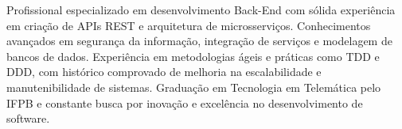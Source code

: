 \begin{cvletter}
  Profissional especializado em desenvolvimento Back-End com sólida experiência em criação de APIs REST e arquitetura de microsserviços. 
  Conhecimentos avançados em segurança da informação, integração de serviços e modelagem de bancos de dados. 
  Experiência em metodologias ágeis e práticas como TDD e DDD, com histórico comprovado de melhoria na escalabilidade e manutenibilidade de sistemas. 
  Graduação em Tecnologia em Telemática pelo IFPB e constante busca por inovação e excelência no desenvolvimento de software.
  
\end{cvletter}